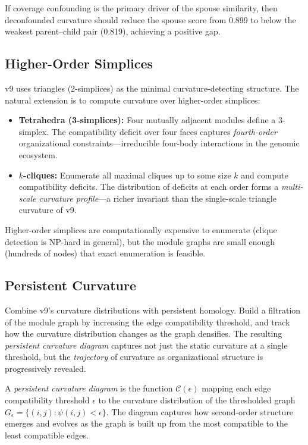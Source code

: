 \documentclass{../yalumba}
\begin{document}
If coverage confounding is the primary driver of the spouse similarity, then
deconfounded curvature should reduce the spouse score from 0.899 to below
the weakest parent--child pair (0.819), achieving a positive gap.

\subsection{Higher-Order Simplices}

v9 uses triangles (2-simplices) as the minimal curvature-detecting structure.
The natural extension is to compute curvature over higher-order simplices:

\begin{itemize}
  \item \textbf{Tetrahedra (3-simplices):}  Four mutually adjacent modules
    define a 3-simplex.  The compatibility deficit over four faces captures
    \emph{fourth-order} organizational constraints---irreducible four-body
    interactions in the genomic ecosystem.

  \item \textbf{$k$-cliques:}  Enumerate all maximal cliques up to some
    size $k$ and compute compatibility deficits.  The distribution of
    deficits at each order forms a \emph{multi-scale curvature profile}---a
    richer invariant than the single-scale triangle curvature of v9.
\end{itemize}

Higher-order simplices are computationally expensive to enumerate (clique
detection is NP-hard in general), but the module graphs are small enough
(hundreds of nodes) that exact enumeration is feasible.

\subsection{Persistent Curvature}

Combine v9's curvature distributions with persistent homology.  Build a
filtration of the module graph by increasing the edge compatibility
threshold, and track how the curvature distribution changes as the graph
densifies.  The resulting \emph{persistent curvature diagram} captures not
just the static curvature at a single threshold, but the \emph{trajectory}
of curvature as organizational structure is progressively revealed.

\begin{definition}
A \emph{persistent curvature diagram} is the function
$\mathcal{C}(\epsilon)$ mapping each edge compatibility threshold $\epsilon$
to the curvature distribution of the thresholded graph $G_\epsilon =
\{(i,j) : \psi(i,j) < \epsilon\}$.  The diagram captures how second-order
structure emerges and evolves as the graph is built up from the most
compatible to the least compatible edges.
\end{definition}
\end{document}
